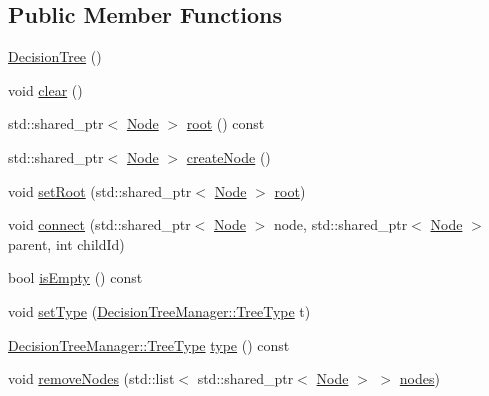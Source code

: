 \subsection*{Public Member Functions}
\begin{DoxyCompactItemize}
\item 
\mbox{\hyperlink{classdtree_1_1_decision_tree_a470fba8e51d63ec23701050de3f06647}{Decision\+Tree}} ()
\item 
void \mbox{\hyperlink{classdtree_1_1_decision_tree_aced396943cf79577905a2d7ae0e0e5c1}{clear}} ()
\item 
std\+::shared\+\_\+ptr$<$ \mbox{\hyperlink{classdtree_1_1_node}{Node}} $>$ \mbox{\hyperlink{classdtree_1_1_decision_tree_a2cd807cc55a488faa17b4fa166168f54}{root}} () const
\item 
std\+::shared\+\_\+ptr$<$ \mbox{\hyperlink{classdtree_1_1_node}{Node}} $>$ \mbox{\hyperlink{classdtree_1_1_decision_tree_a3c3f0ea82ed2d11378592577761c40ba}{create\+Node}} ()
\item 
void \mbox{\hyperlink{classdtree_1_1_decision_tree_a3696b0cc10e0019ff5bdf02e245f3463}{set\+Root}} (std\+::shared\+\_\+ptr$<$ \mbox{\hyperlink{classdtree_1_1_node}{Node}} $>$ \mbox{\hyperlink{classdtree_1_1_decision_tree_a2cd807cc55a488faa17b4fa166168f54}{root}})
\item 
void \mbox{\hyperlink{classdtree_1_1_decision_tree_a6b7eda36962c2c659a198b01a8557531}{connect}} (std\+::shared\+\_\+ptr$<$ \mbox{\hyperlink{classdtree_1_1_node}{Node}} $>$ node, std\+::shared\+\_\+ptr$<$ \mbox{\hyperlink{classdtree_1_1_node}{Node}} $>$ parent, int child\+Id)
\item 
bool \mbox{\hyperlink{classdtree_1_1_decision_tree_abb0901c89130c7e4f06801aef04aed30}{is\+Empty}} () const
\item 
void \mbox{\hyperlink{classdtree_1_1_decision_tree_a3fda9fc04c3a7d5e6fc7188b3b4a23ad}{set\+Type}} (\mbox{\hyperlink{classdtree_1_1_decision_tree_manager_a14180eb59d2c245ce3af1c27ddb0846d}{Decision\+Tree\+Manager\+::\+Tree\+Type}} t)
\item 
\mbox{\hyperlink{classdtree_1_1_decision_tree_manager_a14180eb59d2c245ce3af1c27ddb0846d}{Decision\+Tree\+Manager\+::\+Tree\+Type}} \mbox{\hyperlink{classdtree_1_1_decision_tree_a6434b29061370693f4d1e9de2dcbdb13}{type}} () const
\item 
void \mbox{\hyperlink{classdtree_1_1_decision_tree_a38ca73d4ba02777a8a5d80a60e05a45e}{remove\+Nodes}} (std\+::list$<$ std\+::shared\+\_\+ptr$<$ \mbox{\hyperlink{classdtree_1_1_node}{Node}} $>$ $>$ \mbox{\hyperlink{thread__vessels_8cpp_ace5675146c8515428d094fd142d8a2d2}{nodes}})
\end{DoxyCompactItemize}


